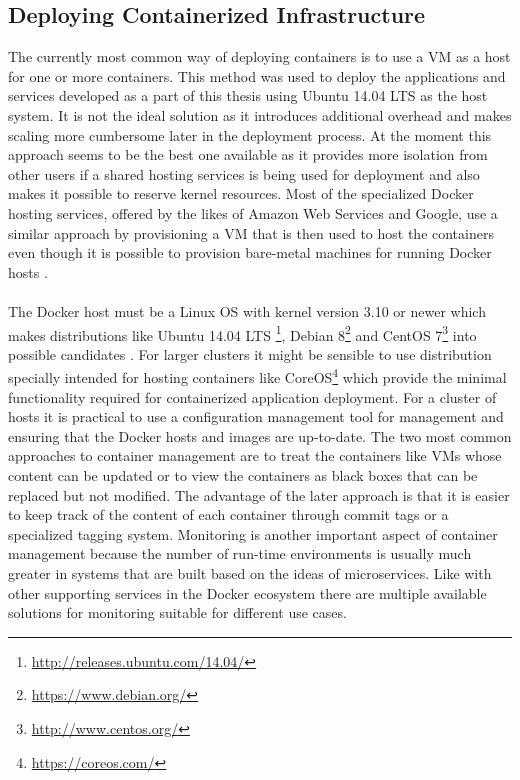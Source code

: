 \subsection{Deploying Containerized Infrastructure}

The currently most common way of deploying containers is to use a VM as a host for one or more containers. This method was used to deploy the applications and services developed as a part of this thesis using Ubuntu 14.04 LTS as the host system. It is not the ideal solution as it introduces additional overhead and makes scaling more cumbersome later in the deployment process. At the moment this approach seems to be the best one available as it provides more isolation from other users if a shared hosting services is being used for deployment and also makes it possible to reserve kernel resources. Most of the specialized Docker hosting services, offered by the likes of Amazon Web Services and Google, use a similar approach by provisioning a VM that is then used to host the containers even though it is possible to provision bare-metal machines for running Docker hosts \cite{mouat2015docker}.
\\ \\
The Docker host must be a Linux OS with kernel version 3.10 or newer which makes distributions like Ubuntu 14.04 LTS \footnote{\url{http://releases.ubuntu.com/14.04/}}, Debian 8\footnote{\url{https://www.debian.org/}} and CentOS 7\footnote{\url{http://www.centos.org/}} into possible candidates \cite{dockerBinaries}. For larger clusters it might be sensible to use distribution specially intended for hosting containers like CoreOS\footnote{\url{https://coreos.com/}} which provide the minimal functionality required for containerized application deployment. For a cluster of hosts it is practical to use a configuration management tool for management and ensuring that the Docker hosts and images are up-to-date. The two most common approaches to container management are to treat the containers like VMs whose content can be updated or to view the containers as black boxes that can be replaced but not modified. The advantage of the later approach is that it is easier to keep track of the content of each container through commit tags or a specialized tagging system. Monitoring is another important aspect of container management because the number of run-time environments is usually much greater in systems that are built based on the ideas of microservices. Like with other supporting services in the Docker ecosystem there are multiple available solutions for monitoring suitable for different use cases.


